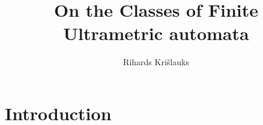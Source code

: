 \documentclass{llncs}
\begin{document}
\title{On the Classes of Finite Ultrametric automata}


\author{
Rihards Kri\v slauks}

\maketitle

\begin{abstract}  
\end{abstract} 



\section{Introduction} 
\end{document}
